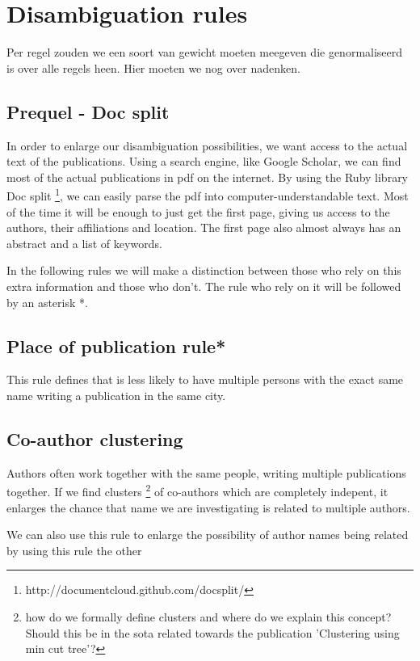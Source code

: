 \section{Disambiguation rules}

Per regel zouden we een soort van gewicht moeten meegeven die genormaliseerd is over alle regels heen. Hier moeten we nog over nadenken.

\subsection{Prequel - Doc split}

In order to enlarge our disambiguation possibilities, we want access to the actual text of the publications. Using a search engine, like Google Scholar, we can find most of the actual publications in pdf on the internet. By using the Ruby library Doc split \footnote{http://documentcloud.github.com/docsplit/}, we can easily parse the pdf into computer-understandable text. Most of the time it will be enough to just get the first page, giving us access to the authors, their affiliations and location. The first page also almost always has an abstract and a list of keywords.

In the following rules we will make a distinction between those who rely on this extra information and those who don't. The rule who rely on it will be followed by an asterisk *.

\subsection{Place of publication rule*}

This rule defines that is less likely to have multiple persons with the exact same name writing a publication in the same city.

\subsection{Co-author clustering}

Authors often work together with the same people, writing multiple publications together. If we find clusters \footnote{how do we formally define clusters and where do we explain this concept? Should this be in the sota related towards the publication 'Clustering using min cut tree'?} of co-authors which are completely indepent, it enlarges the chance that name we are investigating is related to multiple authors.

We can also use this rule to enlarge the possibility of author names being related by using this rule the other 